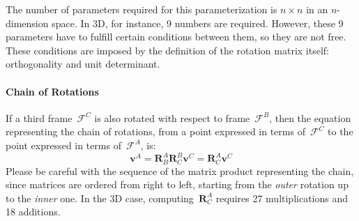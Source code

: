 The number of parameters required for this parameterization is $n \times n$ in an $n$-dimension space. In 3D, for instance, 9 numbers are required. However, these 9 parameters have to fulfill certain conditions between them, so they are not free. These conditions are imposed by the definition of the rotation matrix itself: orthogonality and unit determinant.  

\paragraph{Chain of Rotations}
If a third frame~$\mathcal{F}^C$ is also rotated with respect to frame~$\mathcal{F}^B$, then the equation representing the chain of rotations, from a point expressed in terms of~$\mathcal{F}^C$ to the point expressed in terms of~$\mathcal{F}^A$, is: 
\begin{equation}
 \mathbf{v}^A = \mathbf{R}^A_B \mathbf{R}^B_C \mathbf{v}^C = \mathbf{R}^A_C \mathbf{v}^C
\end{equation}
Please be careful with the sequence of the matrix product representing the chain, since matrices are ordered from right to left, starting from the \textit{outer} rotation up to the \textit{inner} one. In the 3D case, computing~$\mathbf{R}^A_C$ requires 27 multiplications and 18 additions. 


